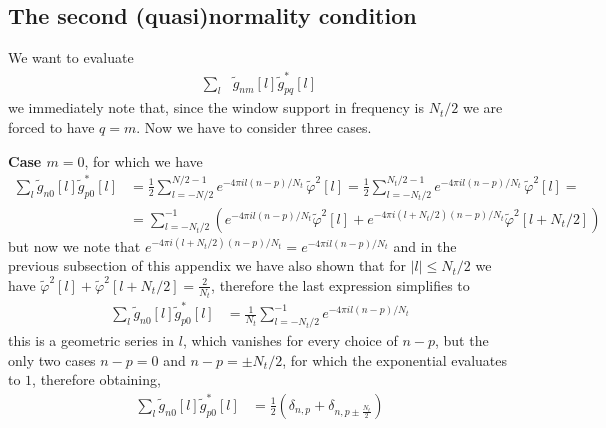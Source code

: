 \documentclass[twocolumn,preprintnumbers,
  superscriptaddress,
  nofootinbib,
  amsmath,
  amssymb,
  aps,
  prd,
  colorlinks=true,
  linkcolor=blue,
  urlcolor=blue,
  citecolor=blue,
  anchorcolor=blue
]{revtex4-2}
\begin{document}
\subsection{The second (quasi)normality condition}
We want to evaluate
%
\begin{align}
\sum_{l}&\tilde{g}_{nm}[l]\tilde{g}_{pq}^*[l]
\end{align}
%
we immediately note that, since the window support in frequency is $N_t/2$ we are forced to have $q=m$. Now we have to consider three cases.

\textbf{Case $m=0$}, for which we have
%
\begin{align}
\sum_{l}\tilde{g}_{n0}[l]\tilde{g}_{p0}^*[l]&=\frac{1}{2}\sum_{l=-N/2}^{N/2-1} e^{-4\pi i l (n-p)/N_t}\, \tilde{\varphi}^2[l]=\frac{1}{2}\sum_{l=-N_t/2}^{N_t/2-1} e^{-4\pi i l (n-p)/N_t}\, \tilde{\varphi}^2[l]=\nonumber\\
&=\sum_{l=-N_t/2}^{-1}\left(e^{-4\pi i l (n-p)/N_t}\tilde{\varphi}^2[l]+e^{-4\pi i (l+N_t/2) (n-p)/N_t}\tilde{\varphi}^2[l+N_t/2]\right)
\end{align}
%
but now we note that $e^{-4\pi i (l+N_t/2) (n-p)/N_t}=e^{-4\pi i l(n-p)/N_t}$ and in the previous subsection of this appendix we have also shown that for $|l|\leq N_t/2$ we have $\tilde{\varphi}^2[l]+\tilde{\varphi}^2[l+N_t/2]=\frac{2}{N_t}$, therefore the last expression simplifies to
%
\begin{align}
\sum_{l}\tilde{g}_{n0}[l]\tilde{g}_{p0}^*[l]&=\frac{1}{N_t}\sum_{l=-N_t/2}^{-1}e^{-4\pi i l (n-p)/N_t}
\end{align}
%
this is a geometric series in $l$, which vanishes for every choice of $n-p$, but the only two cases $n-p=0$ and $n-p=\pm N_t/2$, for which the exponential evaluates to $1$, therefore obtaining,
%
\begin{align}
\sum_{l}\tilde{g}_{n0}[l]\tilde{g}_{p0}^*[l]&=\frac{1}{2}\left(\delta_{n,p}+\delta_{n,p\pm \frac{N_t}{2}}\right)
\end{align}
\end{document}
